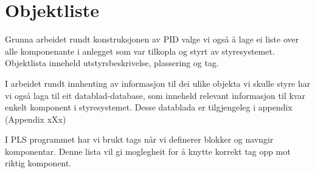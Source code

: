 \section{Objektliste}
\thispagestyle{fancy}

Grunna arbeidet rundt konstruksjonen av \gls{PID} valge vi også å lage ei liste over alle komponenante i anlegget som var tilkopla og styrt av styresystemet.
Objektlista inneheld utstyrsbeskrivelse, plassering og tag. 

I arbeidet rundt innhenting av informasjon til dei ulike objekta vi skulle styre har vi også laga til eit datablad-database,
som inneheld relevant informasjon til kvar enkelt komponent i styresystemet.\newline
Desse datablada er tilgjengeleg i appendix (Appendix xXx)

I PLS programmet har vi brukt tags når vi definerer blokker og navngir komponentar. \newline
Denne lista vil gi moglegheit for å knytte korrekt tag opp mot riktig komponent.



\newpage

